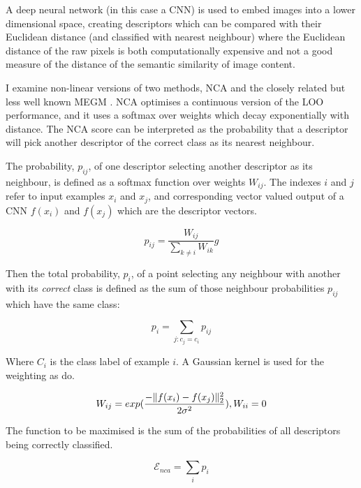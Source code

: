 A deep neural network (in this case a \gls{CNN}) is used to embed images into a lower dimensional space, creating descriptors which can be compared with their Euclidean distance (and classified with nearest neighbour) where the Euclidean distance of the raw pixels is both computationally expensive and not a good measure of the distance of the semantic similarity of image content. 

I examine non-linear versions of two methods, \gls{NCA} \cite{Goldberger2004} and the closely related but less well known \gls{MEGM} \cite {Zaidi2011}. \gls{NCA} optimises a continuous version of the \gls{LOO} performance, and it uses a softmax over weights which decay exponentially with distance. The \gls{NCA} score can be interpreted as the probability that a descriptor will pick another descriptor of the correct class as its nearest neighbour. 

The probability, $ p_{ij} $, of one descriptor selecting another descriptor as its neighbour, is defined as a softmax function over weights $W_{ij}$. The indexes $ i $ and $ j $ refer to input examples $x_i$ and $x_j$, and corresponding vector valued output of a \gls{CNN} $f(x_i)$ and $f(x_j)$ which are the descriptor vectors.

\begin{equation}
\label{eq:nca_prob_pair}
p_{ij} =  \frac {W_{ij}} {\sum_{k \neq i}{W_{ik}}}g
\end{equation}

Then the total probability, $ p_i $, of a point selecting any neighbour with another with its \emph{correct} class is defined as the sum of those neighbour probabilities $p_{ij}$ which have the same class:

\begin{equation}
\label{eq:nca_prob}
p_{i} =  \sum_{j:c_j = c_i}{p_{ij}}
\end{equation}

Where $ C_i $ is the class label of example $ i $. A Gaussian kernel is used for the weighting as \cite{Zaidi2011} do. 

\begin{equation}
 \label{eq:gaussian_kernel}
W_{ij} = exp(\frac{-\lVert f(x_i) - f(x_j) \rVert^2_2 }{2\sigma^2}), \space W_{ii} = 0
\end{equation}


The function to be maximised is the sum of the probabilities of all descriptors being correctly classified.

\begin{equation}
\label{eq:nca_loss}
\mathcal{E}_{nca} =  \sum_i {p_i}
\end{equation}

